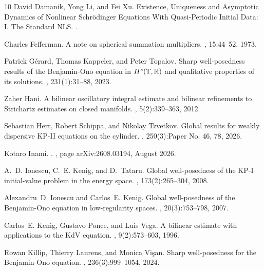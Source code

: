 \documentclass{amsart}
\theoremstyle{definition}
\begin{document}
\begin{thebibliography}{10}
David Damanik, Yong Li, and Fei Xu.
\newblock Existence, {Uniqueness} and {Asymptotic} {Dynamics} of {Nonlinear}
  {Schr{\"o}dinger} {Equations} {With} {Quasi}-{Periodic} {Initial} {Data}:
  {I}. {The} {Standard} {NLS}.
.

Charles Fefferman.
\newblock A note on spherical summation multipliers.
, 15:44--52, 1973.

Patrick G\'{e}rard, Thomas Kappeler, and Peter Topalov.
\newblock Sharp well-posedness results of the {B}enjamin-{O}no equation in
  {$H^s(\Bbb T,\Bbb R)$} and qualitative properties of its solutions.
, 231(1):31--88, 2023.

Zaher Hani.
\newblock A bilinear oscillatory integral estimate and bilinear refinements to
  {Strichartz} estimates on closed manifolds.
, 5(2):339--363, 2012.

Sebastian Herr, Robert Schippa, and Nikolay Tzvetkov.
\newblock Global results for weakly dispersive {KP}-{II} equations on the
  cylinder.
, 250(3):Paper No. 46, 78, 2026.

Kotaro {Inami}.
.
, page arXiv:2608.03194, August 2026.

A.~D. Ionescu, C.~E. Kenig, and D.~Tataru.
\newblock Global well-posedness of the {KP}-{I} initial-value problem in the
  energy space.
, 173(2):265--304, 2008.

Alexandru~D. Ionescu and Carlos~E. Kenig.
\newblock Global well-posedness of the {B}enjamin-{O}no equation in
  low-regularity spaces.
, 20(3):753--798, 2007.

Carlos~E. Kenig, Gustavo Ponce, and Luis Vega.
\newblock A bilinear estimate with applications to the {K}d{V} equation.
, 9(2):573--603, 1996.

Rowan Killip, Thierry Laurens, and Monica Vi\c{s}an.
\newblock Sharp well-posedness for the {B}enjamin-{O}no equation.
, 236(3):999--1054, 2024.


\end{thebibliography}
\end{document}
